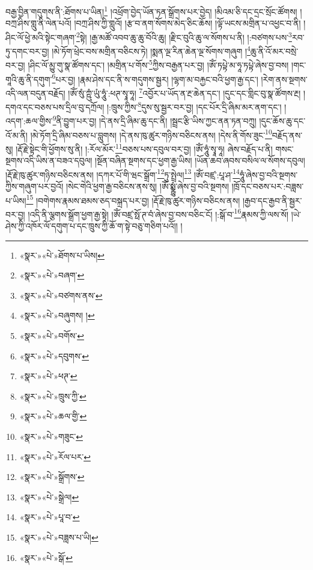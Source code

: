 བརྒྱ་བྱིན་གདུགས་ནི་:ཐོགས་པ་ཡིན།\footnote{«སྣར་»«པེ་»ཐོགས་པ་ཡིས།} །འཕྲོག་བྱེད་ཡོན་ཏན་སྒྲོགས་པར་བྱེད། །མིའམ་ཅི་དང་དྲང་སྲོང་ཚོགས། །བཀྲ་ཤིས་གླུ་ནི་ལེན་པའོ། །བཀྲ་ཤིས་ཀྱི་གླུའོ། །རྩ་བ་ནག་སོགས་མེད་ཅིང་ཆོས། །ལྟོ་ཡངས་མགྲིན་པ་འཕྱང་བ་ནི། །ཤིང་ལོ་ཕྱེ་མའི་སྟེང་གཞག་\footnote{«སྣར་»«པེ་»བཞག་}སྟེ། །རྒྱ་མཚོ་འབབ་ཆུ་ཆུ་བོའི་ཆུ། །རྫིང་བུའི་ཆུ་ལ་སོགས་པ་ནི། །:བཙགས་པས་\footnote{«སྣར་»«པེ་»བཙགས་ནས་}རབ་ཏུ་དགང་བར་བྱ། །མེ་ཏོག་ཕྲེང་བས་མགྲིན་བཅིངས་ཏེ། །སྨན་ལྔ་རིན་ཆེན་ལྔ་སོགས་གཞུག །\footnote{«སྣར་»«པེ་»བཞུགས། །}ཆུ་ནི་འོ་མར་བསྲེ་བར་བྱ། །ཤིང་ལོ་མྱུ་གུ་སྣ་ཚོགས་དང་། །མགྲིན་པ་གོས་\footnote{«སྣར་»«པེ་»བགོས་}ཀྱིས་བརྒྱན་པར་བྱ། །ཨོཾ་ཏཔྟེ་མ་ཧཱ་ཏཔྟེ་ཞེས་བྱ་བས། །གང་གཱའི་ཆུ་ནི་དགུག་\footnote{«སྣར་»«པེ་»དབུགས་}པར་བྱ། །རྣམ་ཤེས་དང་ནི་ས་གདུགས་སྦྱར། །ལྷག་མ་བརྐྱང་བའི་ཕྱག་རྒྱ་དང་། །རེག་ནས་སྔགས་འདི་ལན་བདུན་བརྗོད། །ཨོཾ་སུཾ་ཀྵུཾ་ཡུཾ་ཧཱུཾ་:ཕཊ་སྭཱ་ཧཱ། \footnote{«སྣར་»«པེ་»ཕཊ་}འབྱོར་པ་ཡོད་ན་རྔ་ཆེན་དང་། །དུང་དང་གླིང་བུ་སྣ་ཚོགས་རྔ། །དགའ་དང་བཅས་པས་དྲིལ་བུ་དཀྲོལ། །:ཁྲུས་ཀྱིས་\footnote{«སྣར་»«པེ་»ཁྲུས་ཀྱི་}དུས་སུ་སྦྱར་བར་བྱ། །དང་པོར་དྲི་ཞིམ་མར་ནག་དང་། །འདག་:ཆལ་གྱིས་\footnote{«སྣར་»«པེ་»ཆལ་གྱི་}ནི་བྱུག་པར་བྱ། །དེ་ནས་དྲི་ཞིམ་ཆུ་དང་ནི། །སྦྲང་རྩི་ཡིས་ཀྱང་ནན་ཏན་བཀྲུ། །དུང་ཆོས་ཆུ་དང་འོ་མ་ནི། །མེ་ཏོག་དྲི་ཞིམ་བཅས་པ་བླུགས། །དེ་ནས་ཁུ་ཚུར་གཉིས་བཅིངས་ནས། །དེས་ནི་གོས་ཟུང་\footnote{«སྣར་»«པེ་»གཟུང་}བརྗོད་ནས་སུ། །རྡོ་རྗེ་སྟེང་གི་ཕྱོགས་སུ་ནི། །:རོལ་མོར་\footnote{«སྣར་»«པེ་»རོལ་པར་}བཅས་པས་དབུལ་བར་བྱ། །ཨོཾ་ཧཱུཾ་སྭཱ་ཧཱ། ཞེས་བརྗོད་པ་ནི། གསང་སྔགས་འདི་ཡིས་ན་བཟའ་དབུལ། །སྔོན་བཞིན་སྔགས་དང་ཕྱག་རྒྱ་ཡིས། །ཡོན་ཆབ་ཞབས་བསིལ་ལ་སོགས་དབུལ། །རྡོ་རྗེ་ཁུ་ཚུར་གཉིས་བཅིངས་ནས། །དཀར་པོ་གི་ཝང་སྒྲོག་\footnote{«སྣར་»«པེ་»སྒྲོགས་}ཏུ་སྤྲེལ།\footnote{«སྣར་»«པེ་»སྒྲེལ།} །ཨོཾ་བཛྲ་:པཱ་ཤ་\footnote{«སྣར་»«པེ་»པཱ་བ་}ཧཱུཾ་ཞེས་བྱ་བའི་སྔགས་ཀྱིས་གཞུག་པར་བྱའོ། །སེང་གེའི་ཕྱག་རྒྱ་བཅིངས་ནས་སུ། །ཨོཾ་སྨྼྻུཾ་ཞེས་བྱ་བའི་སྔགས། །ཁྲོ་དང་བཅས་པར་:བཟླས་པ་ཡིས།\footnote{«སྣར་»«པེ་»བཟླས་པ་ཡི།} །བགེགས་རྣམས་ཐམས་ཅད་བསྐྲད་པར་བྱ། །རྡོ་རྗེ་ཁུ་ཚུར་གཉིས་བཅིངས་ནས། །རྒྱབ་དང་རྒྱབ་ནི་སྦྱར་བར་བྱ། །འདི་ནི་ལྕགས་སྒྲོག་ཕྱག་རྒྱ་སྟེ། །ཨོཾ་བཛྲ་སྥོ་ཊ་བཾ་ཞེས་བྱ་བས་བཅིང་ངོ། །:སྒོ་བ་\footnote{«སྣར་»«པེ་»སྒོ་}རྣམས་ཀྱི་ལས་སོ། །ཡེ་ཤེས་ཀྱི་འཁོར་ལོ་དགུག་པ་དང་ཁྲུས་ཀྱི་ཆོ་ག་སྟེ་བཅུ་གཅིག་པའོ།། །
